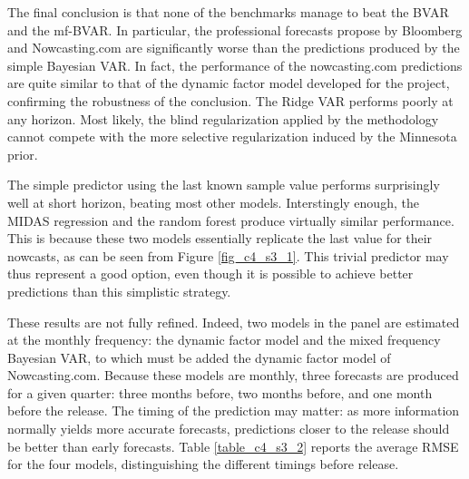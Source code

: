 The final conclusion is that none of the benchmarks manage to beat the BVAR and the mf-BVAR. In particular, the professional forecasts propose by Bloomberg and Nowcasting.com are significantly worse than the predictions produced by the simple Bayesian VAR. In fact, the performance of the nowcasting.com predictions are quite similar to that of the dynamic factor model developed for the project, confirming the robustness of the conclusion. The Ridge VAR performs poorly at any horizon. Most likely, the blind regularization applied by the methodology cannot compete with the more selective regularization induced by the Minnesota prior. 

The simple predictor using the last known sample value performs surprisingly well at short horizon, beating most other models. Interstingly enough, the MIDAS regression and the random forest produce virtually similar performance. This is because these two models essentially replicate the last value for their nowcasts, as can be seen from Figure \ref{fig_c4_s3_1}. This trivial predictor may thus represent a good option, even though it is  possible to achieve better predictions than this simplistic strategy.

These results are not fully refined. Indeed, two models in the panel are estimated at the monthly frequency: the dynamic factor model and the mixed frequency Bayesian VAR, to which must be added the dynamic factor model of Nowcasting.com. Because these models are monthly, three forecasts are produced for a given quarter: three months before, two months before, and one month before the release. The timing of the prediction may matter: as more information normally yields more accurate forecasts, predictions closer to the release should be better than early forecasts. Table \ref{table_c4_s3_2} reports the average RMSE for the four models, distinguishing the different timings before release.

\begin{table}[H] \centering
{}
\captionsetup{justification=centering}
\caption{\textbf{RMSE on nowcasts 1, 2 and 3 months before release}}
\label{table_c4_s3_2}
\end{table}

